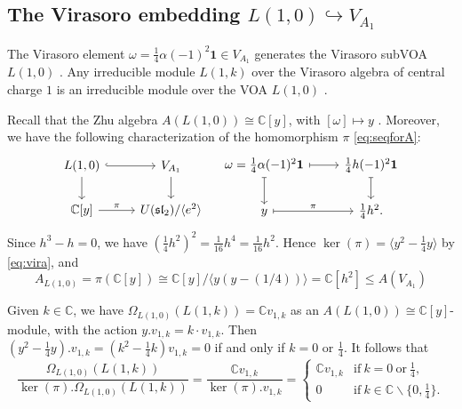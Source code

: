 \documentclass[12pt,a4paper,reqno]{amsart}
\numberwithin{equation}{section}
\numberwithin{equation}{section}
\theoremstyle{definition}
\def \C {\mathbb{C}}
\def \al{\alpha}
\def \om{\omega}
\def\hr{\hookrightarrow}
\def \vac {\mathbf{1}}
\def \bs {\backslash}
\def\Om{\Omega}
\def\<{\langle}
\def\>{\rangle}
\def\sl{\mathfrak{sl}}
\begin{document}
	
	
	\subsection{The Virasoro embedding $L(1,0)\hr V_{A_1}$}
	The Virasoro element $\om=\frac{1}{4}\al(-1)^2\vac\in V_{A_1}$ generates the Virasoro subVOA $L(1,0)$ \cite{DG98}. Any irreducible module $L(1,k)$ over the Virasoro algebra of central charge $1$ is an irreducible module over the VOA $L(1,0)$ \cite{FZ92}. 
	
	Recall that the Zhu algebra 
	$A(L(1,0))\cong \C[y]$, with $[\om]\mapsto y$ \cite{DMZ94,W93}. Moreover, we have the following characterization of the homomorphism $\pi$ \eqref{eq:seqforA}: 
	\begin{equation}\label{eq:vira}
		\begin{tikzcd}
			L(1,0)\arrow[r,hook]\arrow[d]& V_{A_1}\arrow[d]\\
			\C[y]\arrow[r,"\pi"] & U(\sl_2)/\<e^2\>
		\end{tikzcd}\quad 
		\begin{tikzcd}
			\om=\frac{1}{4}\al(-1)^2\vac \arrow[r,mapsto]\arrow[d,mapsto] & \frac{1}{4}h(-1)^2\vac\arrow[d,mapsto]\\
			y\arrow[r,mapsto,"\pi"] & \frac{1}{4}h^2.
		\end{tikzcd}
	\end{equation}
	Since $h^3-h=0$, we have $(\frac{1}{4}h^2)^2=\frac{1}{16}h^4=\frac{1}{16}h^2$. Hence $\ker(\pi)=\<y^2-\frac{1}{4}y\>$ by \eqref{eq:vira}, and
	\begin{equation}\label{eq:AL10}
		A_{L(1,0)}=\pi(\C[y])\cong \C[y]/\<y(y-(1/4))\>= \C[h^2]\leq A(V_{A_1})
	\end{equation}
	
	Given $k\in \C$, we have $\Om_{L(1,0)}(L(1,k))=\C v_{1,k}$ as an $A(L(1,0))\cong \C[y]$-module, with the action $y.v_{1,k}=k\cdot v_{1,k}$. Then $(y^2-\frac{1}{4}y).v_{1,k}=(k^2-\frac{1}{4}k)v_{1,k}=0$ if and only if $k=0$ or $\frac{1}{4}$. It follows that 
	\begin{equation}\label{eq:3.8}
		\frac{\Om_{L(1,0)}(L(1,k))}{\ker(\pi).\Om_{L(1,0)}(L(1,k))}=\frac{\C v_{1,k}}{\ker(\pi).v_{1,k}}=\begin{cases}
			\C v_{1,k}&\mathrm{if}\ k=0\ \mathrm{or}\ \frac{1}{4},\\
			0&\mathrm{if}\ k\in \C\bs\{0,\frac{1}{4} \}. 
		\end{cases}
	\end{equation}
	
\end{document}
